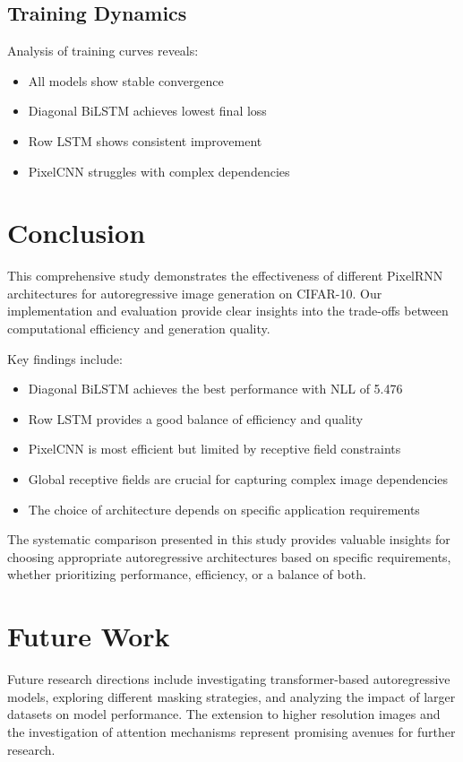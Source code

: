 \documentclass[norunningheads]{llncs}
\begin{document}
\subsection{Training Dynamics}

Analysis of training curves reveals:
\begin{itemize}
\item All models show stable convergence
\item Diagonal BiLSTM achieves lowest final loss
\item Row LSTM shows consistent improvement
\item PixelCNN struggles with complex dependencies
\end{itemize}

\section{Conclusion}

This comprehensive study demonstrates the effectiveness of different PixelRNN architectures for autoregressive image generation on CIFAR-10. Our implementation and evaluation provide clear insights into the trade-offs between computational efficiency and generation quality.

Key findings include:
\begin{itemize}
\item Diagonal BiLSTM achieves the best performance with NLL of 5.476
\item Row LSTM provides a good balance of efficiency and quality
\item PixelCNN is most efficient but limited by receptive field constraints
\item Global receptive fields are crucial for capturing complex image dependencies
\item The choice of architecture depends on specific application requirements
\end{itemize}

The systematic comparison presented in this study provides valuable insights for choosing appropriate autoregressive architectures based on specific requirements, whether prioritizing performance, efficiency, or a balance of both.

\section{Future Work}

Future research directions include investigating transformer-based autoregressive models, exploring different masking strategies, and analyzing the impact of larger datasets on model performance. The extension to higher resolution images and the investigation of attention mechanisms represent promising avenues for further research.
\end{document}
